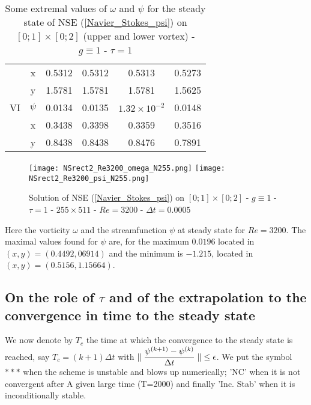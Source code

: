 {\begin{table}[!ht]
\begin{center}
\begin{tabular}{|  c|c|c|c|c|c | }
                & x           & 0.5312           &  0.5312          & 0.5313                & 0.5273\\ 

                & y           & 1.5781           &  1.5781          & 1.5781                & 1.5625\\ 
\hline 
VI              & $\psi$      & 0.0134           &  0.0135          & $1.32 \times 10^{-2}$ & 0.0148\\ 

                & x           & 0.3438           &  0.3398          & 0.3359                & 0.3516\\ 
                
                & y           & 0.8438           &  0.8438          & 0.8476                & 0.7891\\ 
\hline
\end{tabular} 




\caption{Some extremal values of $\omega$ and $\psi$ for the steady state of NSE (\ref{Navier_Stokes_psi}) on $[0; 1] \times [0; 2]$ (upper and lower vortex) - $g \equiv 1$ - $\tau = 1$}
\label{Vortex_rect}
\end{center}
\end{table}
\clearpage

\begin{figure}[!ht]
\begin{center}
\texttt{[image: NSrect2\_Re3200\_omega\_N255.png]}
\texttt{[image: NSrect2\_Re3200\_psi\_N255.png]}\\
\caption{Solution of NSE (\ref{Navier_Stokes_psi}) on $[0; 1] \times [0; 2]$ - $g \equiv 1$ - $\tau = 1$ -  $255 \times 511$ - $Re = 3200$ - $\Delta t = 0.0005$}
\label{NSrect_Re3200}
\end{center}
\end{figure}
Here the vorticity $\omega$ and the streamfunction $\psi$ at steady state for $Re=3200$. The maximal values found 
for $\psi$ are, for the maximum $0.0196$ located in $(x,y)=(0.4492,06914)$ and the minimum is $-1.215$, located in
$(x,y)=(0.5156,1.15664)$.

\subsection{On the role of $\tau$ and of the extrapolation to the convergence in time to the steady state}

We now denote by $T_c$ the time at which the convergence to the steady state is reached, say $T_c=(k+1)\Delta t$ with
$\displaystyle{ \parallel \frac{\textstyle \psi^{(k+1)}-\psi^{(k)} } {\textstyle \Delta t}\parallel } \le \epsilon$. We put the symbol $***$ when the scheme is unstable and blows up numerically; 'NC' when it is not convergent after A given large time (T=2000) and finally 'Inc. Stab' when it is inconditionally stable.

}
